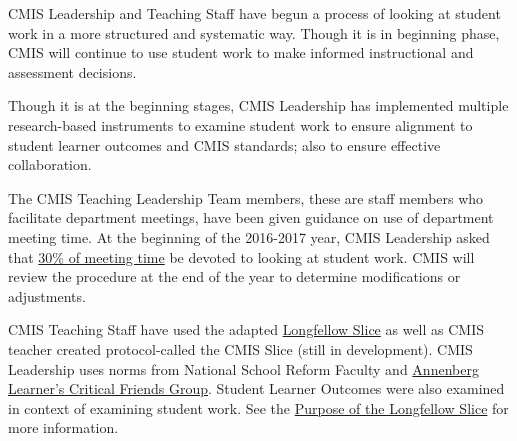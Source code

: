 

\begin{findings}
CMIS Leadership and Teaching Staff have begun a process of looking at student work in a more structured and systematic way. Though it is in beginning phase, CMIS will continue to use student work to make informed instructional and assessment decisions. 

 
Though it is at the beginning stages, CMIS Leadership has implemented multiple research-based instruments to examine student work to ensure  alignment to student learner outcomes and CMIS standards; also to ensure effective collaboration. 

The CMIS Teaching Leadership Team members, these are staff members who facilitate department meetings, have been given guidance on use of department meeting time. At the beginning of the 2016-2017 year, CMIS Leadership asked that \href{https://docs.google.com/a/cmis.ac.th/presentation/d/11Wq8TM-_m7aCMtXKXjWWx5iQ52lH1EOPMP0RmcLnmTA/edit?usp=sharing}{30\% of meeting time} be devoted to looking at student work. CMIS will review the procedure at the end of the year to determine modifications or adjustments. 

CMIS Teaching Staff have used the adapted \href{https://docs.google.com/a/cmis.ac.th/document/d/1aobA3IksQDoGJ-JKci0YDfFDCgT2ugHM7r_T4i_CL7o/edit?usp=sharing}{Longfellow Slice} as well as CMIS teacher created protocol-called the CMIS Slice (still in development). CMIS Leadership uses norms from National School Reform Faculty and \href{https://drive.google.com/a/cmis.ac.th/file/d/0ByVFfrm0zfoleTBsYnhNUFZHbVE/view?usp=sharing}{Annenberg Learner’s Critical Friends Group}. Student Learner Outcomes were also examined in context of examining student work. See the \href{https://docs.google.com/a/cmis.ac.th/document/d/1En9qeldzNSJDHs7m_jRRqNUx6v1EMKD_5MRH0GJsFQM/edit?usp=sharing}{Purpose of the Longfellow Slice} for more information.  


\end{findings}
